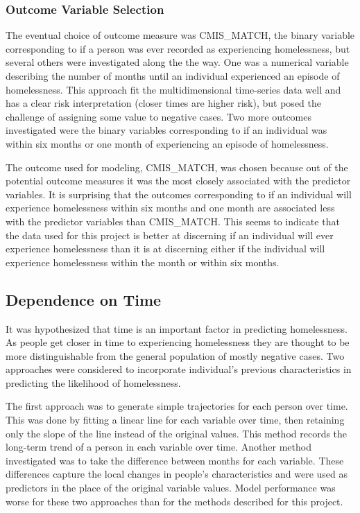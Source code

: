 \documentclass[10pt,letterpaper]{article}
\begin{document}
\subsubsection*{Outcome Variable Selection}
The eventual choice of outcome measure was CMIS\_MATCH, the binary variable corresponding to if a person was ever recorded as experiencing homelessness, but several others were investigated along the the way. One was a numerical variable describing the number of months until an individual experienced an episode of homelessness. This approach fit the multidimensional time-series data well and has a clear risk interpretation (closer times are higher risk), but posed the challenge of assigning some value to negative cases. Two more outcomes investigated were the binary variables corresponding to if an individual was within six months or one month of experiencing an episode of homelessness.

The outcome used for modeling, CMIS\_MATCH, was chosen because out of the potential outcome measures it was the most closely associated with the predictor variables. It is surprising that the outcomes corresponding to if an individual will experience homelessness within six months and one month are associated less with the predictor variables than CMIS\_MATCH. This seems to indicate that the data used for this project is better at discerning if an individual will ever experience homelessness than it is at discerning either if the individual will experience homelessness within the month or within six months.

\subsection*{Dependence on Time}
It was hypothesized that time is an important factor in predicting homelessness. As people get closer in time to experiencing homelessness they are thought to be more distinguishable from the general population of mostly negative cases. Two approaches were considered to incorporate individual's previous characteristics in predicting the likelihood of homelessness.

The first approach was to generate simple trajectories for each person over time. This was done by fitting a linear line for each variable over time, then retaining only the slope of the line instead of the original values. This method records the long-term trend of a person in each variable over time. Another method investigated was to take the difference between months for each variable. These differences capture the local changes in people's characteristics and were used as predictors in the place of the original variable values. Model performance was worse for these two approaches than for the methods described for this project.
\end{document}

